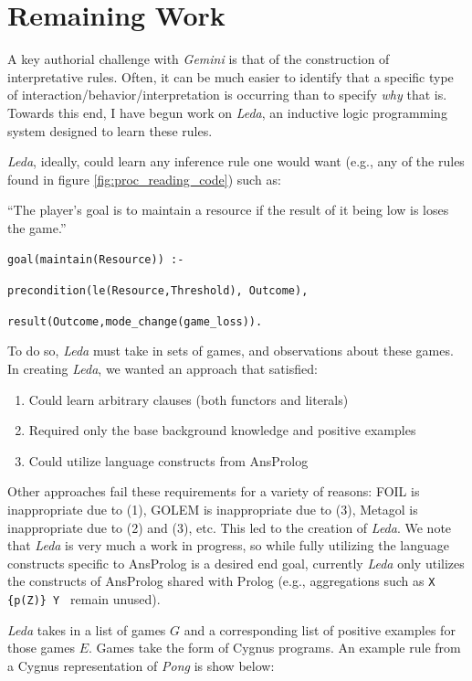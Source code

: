 \documentclass[12pt]{report}
\begin{document}
\section*{Remaining Work}

A key authorial challenge with \textit{Gemini} is that of the construction of interpretative rules.  Often, it can be much easier to identify that a specific type of interaction/behavior/interpretation is occurring than to specify \textit{why} that is.  Towards this end, I have begun work on \textit{Leda}, an inductive logic programming system designed to learn these rules.

\textit{Leda}, ideally, could learn any inference rule one would want (e.g., any of the rules found in figure \ref{fig:proc_reading_code}) such as:

``The player's goal is to maintain a resource if the result of it being low is loses the game.''

\noindent \texttt{goal(maintain(Resource)) :-}

\texttt{precondition(le(Resource,Threshold), Outcome),}

\texttt{result(Outcome,mode\_change(game\_loss)).}

\noindent To do so, \textit{Leda} must take in sets of games, and observations about these games.  In creating \textit{Leda}, we wanted an approach that satisfied:

\begin{enumerate}
\item Could learn arbitrary clauses (both functors and literals)
\item Required only the base background knowledge and positive examples
\item Could utilize language constructs from AnsProlog
\end{enumerate}

Other approaches fail these requirements for a variety of reasons: FOIL \cite{FOIL} is inappropriate due to (1), GOLEM \cite{GOLEM} is inappropriate due to (3), Metagol \cite{Metgol} is inappropriate due to (2) and (3), etc. This led to the creation of \textit{Leda}. We note that \textit{Leda} is very much a work in progress, so while fully utilizing the language constructs specific to AnsProlog is a desired end goal, currently \textit{Leda} only utilizes the constructs of AnsProlog shared with Prolog (e.g., aggregations such as \texttt{X \{p(Z)\} Y } remain unused).

\textit{Leda} takes in a list of games $G$ and a corresponding list of positive examples for those games $E$. Games take the form of Cygnus \cite{martens2016proceduralist} programs. An example rule from a Cygnus representation of \textit{Pong} is show below:
\end{document}
